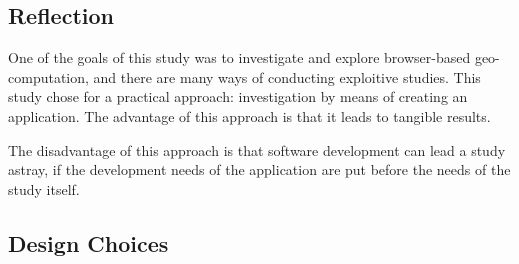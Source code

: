 \subsection{Reflection}

One of the goals of this study was to investigate and explore browser-based geo-computation, and there are many ways of conducting exploitive studies. 
This study chose for a practical approach: investigation by means of creating an application.
The advantage of this approach is that it leads to tangible results. 

The disadvantage of this approach is that software development can lead a study astray, if the development needs of the application are put before the needs of the study itself.












\subsection{ Design Choices }






